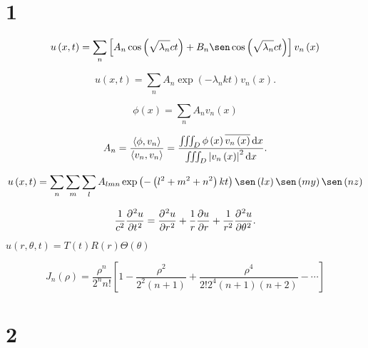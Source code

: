 \section{1}

\begin{equation*}
	u\left(x,t\right)=
	\sum_{n}
	\left[
		A_{n}
		\cos\left(\sqrt{\lambda_{n}}ct\right)+
		B_{n}
		\sen
		\cos\left(\sqrt{\lambda_{n}}ct\right)
	\right]
	v_{n}\left(x\right)
\end{equation*}

\begin{equation*}
	u\left(x,t\right)=
	\sum_{n}
	A_{n}
	\exp\left(-\lambda_{n}kt\right)
	v_{n}\left(x\right).
\end{equation*}

\begin{equation*}
	\phi\left(x\right)=
	\sum_{n}
	A_{n}
	v_{n}\left(x\right)
\end{equation*}


\begin{equation*}
	A_{n}=
	\frac{\left\langle\phi,v_{n}\right\rangle}{\left\langle v_{n},v_{n}\right\rangle}=
	\frac{\iiint_{D}\phi\left(x\right)\overline{v_{n}\left(x\right)}\dl x}{\iiint_{D}{\left|v_{n}\left(x\right)\right|}^{2}\dl x}.
\end{equation*}


\begin{equation*}
	u\left(x,t\right)=
	\sum_{n}
	\sum_{m}
	\sum_{l}
	A_{lmn}
	\exp\left(-\left(l^{2}+m^{2}+n^{2}\right)kt\right)
	\sen\left(lx\right)
	\sen\left(my\right)
	\sen\left(nz\right)
\end{equation*}

\begin{equation*}
	\frac{1}{c^{2}}
	\diffp[2]{u}{t}=
	\diffp[2]{u}{r}+
	\frac{1}{r}
	\diffp{u}{r}+
	\frac{1}{r^{2}}
	\diffp[2]{u}{\theta}.
\end{equation*}


$u\left(r,\theta,t\right)=T\left(t\right)R\left(r\right)\Theta\left(\theta\right)$

\begin{equation*}
	J_{n}\left(\rho\right)=
	\frac{\rho^{n}}{2^{n}n!}
	\left[
		1-
		\frac{\rho^{2}}{2^{2}\left(n+1\right)}+
		\frac{\rho^{4}}{2!2^{4}\left(n+1\right)\left(n+2\right)}-\cdots
		\right]
\end{equation*}

\section{2}
